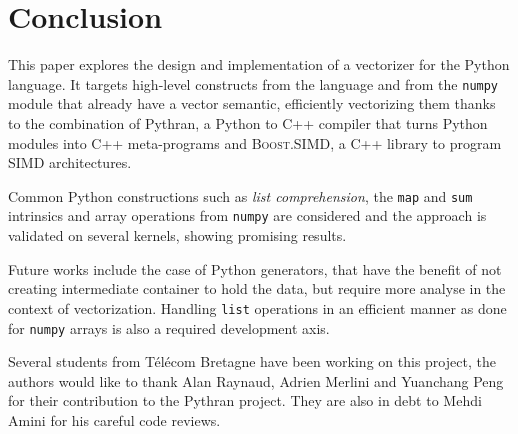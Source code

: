 \documentclass[preprint]{sigplanconf}
\providecommand{\boostsimd}{\textsc{Boost.SIMD}}
\begin{document}
\section*{Conclusion}

This paper explores the design and implementation of a vectorizer for the
Python language. It targets high-level constructs from the language and from
the \texttt{numpy} module that already have a vector semantic, efficiently
vectorizing them thanks to the combination of Pythran, a Python to C++ compiler
that turns Python modules into C++ meta-programs and \boostsimd, a C++ library
to program SIMD architectures.

Common Python constructions such as \emph{list comprehension}, the \texttt{map}
and \texttt{sum} intrinsics and array operations from \texttt{numpy} are
considered and the approach is validated on several kernels, showing
promising results.

Future works include the case of Python generators, that have the benefit of not
creating intermediate container to hold the data, but require more analyse in
the context of vectorization. Handling \texttt{list} operations in an efficient
manner as done for \texttt{numpy} arrays is also a required development axis.

\acks

Several students from T{\'e}l{\'e}com Bretagne have been working on this project, the
authors would like to thank Alan Raynaud, Adrien Merlini and Yuanchang Peng for
their contribution to the Pythran project. They are also in debt to Mehdi
Amini for his careful code reviews.





\end{document}
